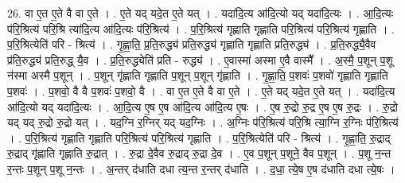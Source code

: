\documentclass[17pt]{extarticle}
\begin{document}
26. वा ए॒त ए॒ते वै वा ए॒ते । . ए॒ते यद् यदे॒त ए॒ते यत् । . यदा॑दि॒त्य आ॑दि॒त्यो यद् यदा॑दि॒त्यः । . आ॒दि॒त्यः प॑रि॒श्रित्य॑ परि॒श्रि त्या॑दि॒त्य आ॑दि॒त्यः प॑रि॒श्रित्य॑ । . प॒रि॒श्रित्य॑ गृह्णाति गृह्णाति परि॒श्रित्य॑ परि॒श्रित्य॑ गृह्णाति । . प॒रि॒श्रित्येति॑ परि - श्रित्य॑ । . गृ॒ह्णा॒ति॒ प्र॒ति॒रुद्ध्य॑ प्रति॒रुद्ध्य॑ गृह्णाति गृह्णाति प्रति॒रुद्ध्य॑ । . प्र॒ति॒रुद्ध्यै॒वैव प्र॑ति॒रुद्ध्य॑ प्रति॒रुद्ध् यै॒व । . प्र॒ति॒रुद्ध्येति॑ प्रति - रुद्ध्य॑ । . ए॒वास्मा॑ अस्मा ए॒वै वास्मै᳚ । . अ॒स्मै॒ प॒शून् प॒शू न॑स्मा अस्मै प॒शून् । . प॒शून् गृ॑ह्णाति गृह्णाति प॒शून् प॒शून् गृ॑ह्णाति । . गृ॒ह्णा॒ति॒ प॒शवः॑ प॒शवो॑ गृह्णाति गृह्णाति प॒शवः॑ । . प॒शवो॒ वै वै प॒शवः॑ प॒शवो॒ वै । . वा ए॒त ए॒ते वै वा ए॒ते । . ए॒ते यद् यदे॒त ए॒ते यत् । . यदा॑दि॒त्य आ॑दि॒त्यो यद् यदा॑दि॒त्यः । . आ॒दि॒त्य ए॒ष ए॒ष आ॑दि॒त्य आ॑दि॒त्य ए॒षः । . ए॒ष रु॒द्रो रु॒द्र ए॒ष ए॒ष रु॒द्रः । . रु॒द्रो यद् यद् रु॒द्रो रु॒द्रो यत् । . यद॒ग्नि र॒ग्निर् यद् यद॒ग्निः । . अ॒ग्निः प॑रि॒श्रित्य॑ परि॒श्रि त्या॒ग्नि र॒ग्निः प॑रि॒श्रित्य॑ । . प॒रि॒श्रित्य॑ गृह्णाति गृह्णाति परि॒श्रित्य॑ परि॒श्रित्य॑ गृह्णाति । . प॒रि॒श्रित्येति॑ परि - श्रित्य॑ । . गृ॒ह्णा॒ति॒ रु॒द्राद् रु॒द्राद् गृ॑ह्णाति गृह्णाति रु॒द्रात् । . रु॒द्रा दे॒वैव रु॒द्राद् रु॒द्रा दे॒व । . ए॒व प॒शून् प॒शूने॒ वैव प॒शून् । . प॒शू न॒न्त र॒न्तः प॒शून् प॒शू न॒न्तः । . अ॒न्तर् द॑धाति दधा त्य॒न्त र॒न्तर् द॑धाति । . द॒धा॒ त्ये॒ष ए॒ष द॑धाति दधा त्ये॒षः । \newline
\end{document}
